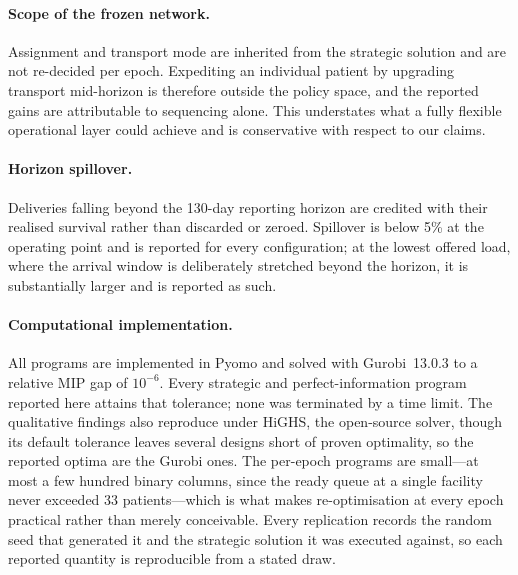 \paragraph{Scope of the frozen network.} Assignment and transport mode are
inherited from the strategic solution and are not re-decided per epoch.
Expediting an individual patient by upgrading transport mid-horizon is
therefore outside the policy space, and the reported gains are attributable to
sequencing alone. This understates what a fully flexible operational layer
could achieve and is conservative with respect to our claims.

\paragraph{Horizon spillover.} Deliveries falling beyond the 130-day reporting
horizon are credited with their realised survival rather than discarded or
zeroed. Spillover is below 5\% at the operating point and is reported for every
configuration; at the lowest offered load, where the arrival window is
deliberately stretched beyond the horizon, it is substantially larger and is
reported as such.

\paragraph{Computational implementation.} All programs are implemented in
Pyomo and solved with Gurobi~13.0.3 to a relative MIP gap of $10^{-6}$. Every
strategic and perfect-information program reported here attains that tolerance;
none was terminated by a time limit. The qualitative findings also reproduce
under HiGHS, the open-source solver, though its default tolerance leaves several
designs short of proven optimality, so the reported optima are the Gurobi ones. The per-epoch programs are small---at most a few hundred binary
columns, since the ready queue at a single facility never exceeded 33
patients---which is what makes re-optimisation at every epoch practical rather
than merely conceivable. Every replication records the random seed that
generated it and the strategic solution it was executed against, so each
reported quantity is reproducible from a stated draw.
